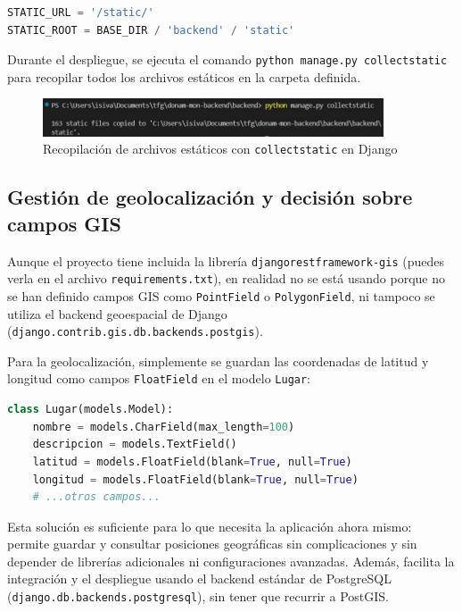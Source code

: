\begin{lstlisting}[language=Python, caption={Archivos estáticos en settings.py}]
STATIC_URL = '/static/'
STATIC_ROOT = BASE_DIR / 'backend' / 'static'
\end{lstlisting}

Durante el despliegue, se ejecuta el comando \texttt{python manage.py collectstatic} para recopilar todos los archivos estáticos en la carpeta definida.

\begin{figure}[H]
    \centering
    \includegraphics[width=0.9\textwidth]{figs/back.jpg}
    \caption{Recopilación de archivos estáticos con \texttt{collectstatic} en Django}
\end{figure}

\subsection{Gestión de geolocalización y decisión sobre campos GIS}

Aunque el proyecto tiene incluida la librería \texttt{djangorestframework-gis} (puedes verla en el archivo \texttt{requirements.txt}), en realidad no se está usando porque no se han definido campos GIS como \texttt{PointField} o \texttt{PolygonField}, ni tampoco se utiliza el backend geoespacial de Django (\texttt{django.contrib.gis.db.backends.postgis}).

Para la geolocalización, simplemente se guardan las coordenadas de latitud y longitud como campos \texttt{FloatField} en el modelo \texttt{Lugar}:

\begin{lstlisting}[language=Python, caption={Fragmento del modelo Lugar}]
class Lugar(models.Model):
    nombre = models.CharField(max_length=100)
    descripcion = models.TextField()
    latitud = models.FloatField(blank=True, null=True)
    longitud = models.FloatField(blank=True, null=True)
    # ...otros campos...
\end{lstlisting}

Esta solución es suficiente para lo que necesita la aplicación ahora mismo: permite guardar y consultar posiciones geográficas sin complicaciones y sin depender de librerías adicionales ni configuraciones avanzadas. Además, facilita la integración y el despliegue usando el backend estándar de PostgreSQL (\texttt{django.db.backends.postgresql}), sin tener que recurrir a PostGIS.

